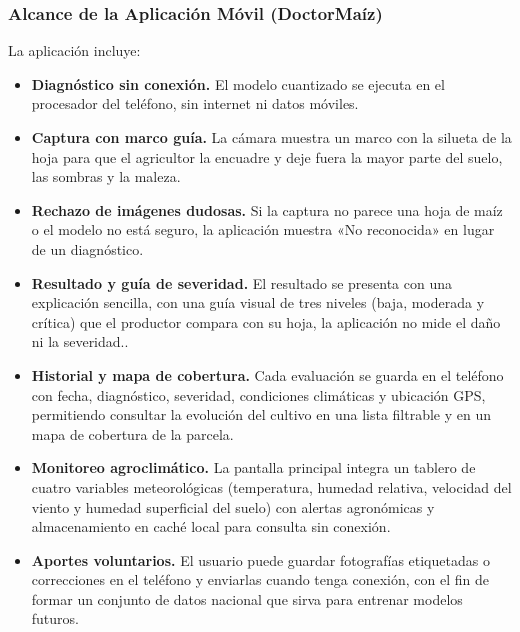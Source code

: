 \subsubsection{Alcance de la Aplicaci\'on M\'ovil (DoctorMa\'iz)}
La aplicaci\'on incluye:
\begin{itemize}
\item \textbf{Diagn\'ostico sin conexi\'on.} El modelo cuantizado se ejecuta en el procesador del tel\'efono, sin internet ni datos m\'oviles.
\item \textbf{Captura con marco gu\'ia.} La c\'amara muestra un marco con la silueta de la hoja para que el agricultor la encuadre y deje fuera la mayor parte del suelo, las sombras y la maleza.
\item \textbf{Rechazo de im\'agenes dudosas.} Si la captura no parece una hoja de ma\'iz o el modelo no est\'a seguro, la aplicaci\'on muestra «No reconocida» en lugar de un diagn\'ostico.
\item \textbf{Resultado y gu\'ia de severidad.} El resultado se presenta con una explicación sencilla, con una gu\'ia visual de tres niveles (baja, moderada y cr\'itica) que el productor compara con su hoja, la aplicaci\'on no mide el da\~no ni la severidad..
\item \textbf{Historial y mapa de cobertura.} Cada evaluaci\'on se guarda en el tel\'efono con fecha, diagn\'ostico, severidad, condiciones clim\'aticas y ubicaci\'on GPS, permitiendo consultar la evoluci\'on del cultivo en una lista filtrable y en un mapa de cobertura de la parcela.
\item \textbf{Monitoreo agroclim\'atico.} La pantalla principal integra un tablero de cuatro variables meteorol\'ogicas (temperatura, humedad relativa, velocidad del viento y humedad superficial del suelo) con alertas agron\'omicas y almacenamiento en cach\'e local para consulta sin conexi\'on.
\item \textbf{Aportes voluntarios.} El usuario puede guardar fotograf\'ias etiquetadas o correcciones en el tel\'efono y enviarlas cuando tenga conexi\'on, con el fin de formar un conjunto de datos nacional que sirva para entrenar modelos futuros.
\end{itemize}

